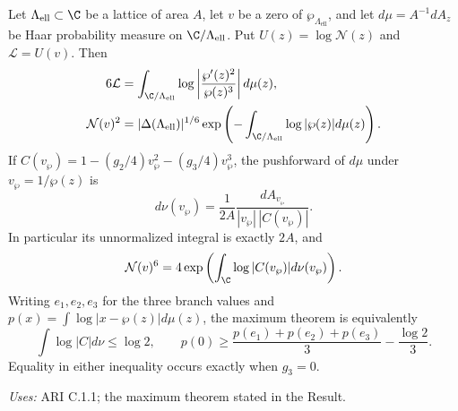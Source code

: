 \begin{proposition}\label{ari:C.8.6}
Let $\Lambda_{\mathrm{ell}}\subset\C$ be a lattice of area $A$, let $v$ be a zero
of $\wp_{\Lambda_{\mathrm{ell}}}$, and let $d\mu=A^{-1}dA_z$ be Haar probability
measure on $\C/\Lambda_{\mathrm{ell}}$. Put $U(z)=\log \mathcal N(z)$ and
$\mathcal L=U(v)$. Then
\begin{align}
 6\mathcal L&=\int_{\C/\Lambda_{\mathrm{ell}}}\log\left|\frac{\wp'(z)^2}{\wp(z)^3}\right|d\mu(z),
 \label{ari:eq:ca-mahler}\\
 \mathcal N(v)^2&=|\Delta(\Lambda_{\mathrm{ell}})|^{1/6}
      \exp\left(-\int_{\C/\Lambda_{\mathrm{ell}}}\log|\wp(z)|d\mu(z)\right).
 \label{ari:eq:ca-wpmean}
\end{align}
If $C(v_{\wp})=1-(g_2/4)v_{\wp}^2-(g_3/4)v_{\wp}^3$, the pushforward of $d\mu$
under $v_{\wp}=1/\wp(z)$ is
\begin{equation}\label{ari:eq:ca-nu}
 d\nu(v_{\wp})=\frac1{2A}\frac{dA_{v_{\wp}}}{|v_{\wp}|\,|C(v_{\wp})|}.
\end{equation}
In particular its unnormalized integral is exactly $2A$, and
\[
 \mathcal N(v)^6=4\exp\left(\int_{\C}\log|C(v_{\wp})|d\nu(v_{\wp})\right).
\]
Writing $e_1,e_2,e_3$ for the three branch values and
$p(x)=\int\log|x-\wp(z)|d\mu(z)$, the maximum theorem is equivalently
\[
 \int\log|C|d\nu\leq\log2,\qquad
 p(0)\geq\frac{p(e_1)+p(e_2)+p(e_3)}3-\frac{\log2}3.
\]
Equality in either inequality occurs exactly when $g_3=0$.
\end{proposition}
\noindent\textit{Uses:} ARI C.1.1; the maximum theorem stated in the Result.\par

